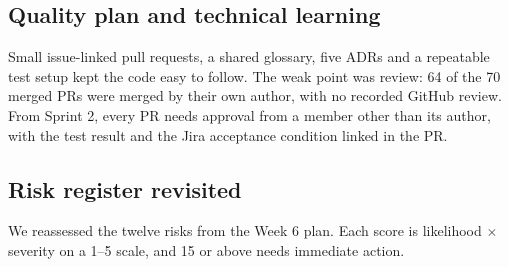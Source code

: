 \documentclass[11pt,a4paper]{article}
\begin{document}
\subsection{Quality plan and technical learning}
Small issue-linked pull requests, a shared glossary, five ADRs and a repeatable test setup kept the code easy to follow. The weak point was review: 64 of the 70 merged PRs were merged by their own author, with no recorded GitHub review. From Sprint 2, every PR needs approval from a member other than its author, with the test result and the Jira acceptance condition linked in the PR.

\subsection{Risk register revisited}
We reassessed the twelve risks from the Week 6 plan. Each score is likelihood $\times$ severity on a 1--5 scale, and 15 or above needs immediate action.
\end{document}
